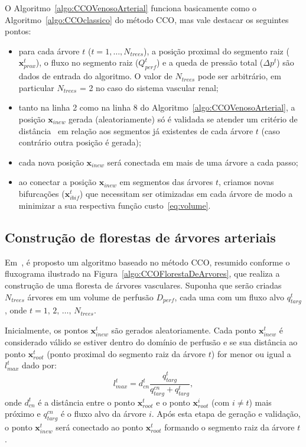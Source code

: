 O Algoritmo~\ref{algo:CCOVenosoArterial} funciona basicamente como o Algoritmo~\ref{algo:CCOclassico} 
do método CCO, mas vale destacar os seguintes pontos:
\begin{itemize}
 \item para cada árvore $t$ ($t=1,\ldots,N_{trees}$), a posi\c{c}\~ao proximal do segmento raiz ($\mathbf{x}_{prox}^t$), 
 o fluxo no segmento raiz ($Q_{perf}^t$) e a queda de pressão total ($\Delta p^t$) são dados de entrada do algoritmo.
 O valor de $N_{trees}$ pode ser arbitrário, em particular $N_{trees}$ = 2 no caso do sistema vascular 
 renal;
 
 \item tanto na linha 2 como na linha 8 do Algoritmo~\ref{algo:CCOVenosoArterial}, a posi\c{c}\~ao $\mathbf{x}_{inew}$
 gerada (aleatoriamente) só é validada se atender um critério de 
 distância~\cite{Queiroz2013, Schreiner1993b} em rela\c{c}\~ao aos segmentos já existentes 
 de cada árvore $t$ (caso contrário outra posição é gerada);

 \item cada nova posi\c{c}\~ao $\mathbf{x}_{inew}$ será conectada em mais de uma árvore a cada passo; 
  
 \item ao conectar a posi\c{c}\~ao $\mathbf{x}_{inew}$ em segmentos das árvores $t$, criamos novas bifurcações 
 ($\mathbf{x}_{ibif}^t$) que necessitam ser otimizadas em cada árvore de modo a minimizar a sua respectiva 
 função custo~\eqref{eq:volume}.
\end{itemize}

\subsection{Construção de florestas de árvores arteriais}\label{subsec:floresta-vascular}

Em~\cite{Jaquet2019}, é proposto um algoritmo baseado no método CCO, 
resumido conforme o fluxograma ilustrado na Figura~\ref{algo:CCOFlorestaDeArvores}, 
que realiza a construção de uma floresta de árvores vasculares. 
Suponha que serão criadas $N_{trees}$ árvores em um volume de perfusão $D_{perf}$, 
cada uma com um fluxo alvo $q_{targ}^t$, onde $t = 1,\,2,\,\ldots,\,N_{trees}$. 

Inicialmente, os pontos $\mathbf{x}_{inew}^t$ são gerados aleatoriamente. 
Cada ponto $\mathbf{x}_{inew}^t$ é 
considerado válido se estiver dentro do domínio de perfusão e se sua distância ao 
ponto $\mathbf{x}_{root}^t$ (ponto proximal do segmento raiz da árvore $t$) for 
menor ou igual a $l_{max}^t$ dado por:
\begin{equation}
 l_{max}^t = d_{cn}^t \dfrac{q_{targ}^t}{q_{targ}^{cn} + q_{targ}^t},
 \label{eq:criterio.distancia.raiz}
\end{equation}
onde $d_{cn}^t$ é a distância entre o ponto $\mathbf{x}_{root}^t$ 
e o ponto $\mathbf{x}_{root}^i$ (com $i\neq t$) mais próximo 
e $q_{targ}^{cn}$ é o fluxo alvo da árvore $i$. Após esta etapa de geração e validação, 
o ponto $\mathbf{x}_{inew}^t$ será conectado ao ponto $\mathbf{x}_{root}^t$ formando
o segmento raiz da árvore $t$.

